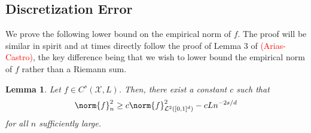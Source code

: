 \documentclass{article}
\newcommand{\1}{\mathbf{1}}
\newcommand{\Xset}{\mathcal{X}}
\newcommand{\Leb}{\mathcal{L}}
\theoremstyle{alden}
\theoremstyle{aldenthm}
\newtheorem{lemma}{Lemma}
\theoremstyle{definition}
\theoremstyle{remark}
\begin{document}
\subsection{Discretization Error}
We prove the following lower bound on the empirical norm of $f$. The proof will be similar in spirit and at times directly follow the proof of Lemma 3 of \textcolor{red}{(Arias-Castro)}, the key difference being that we wish to lower bound the empirical norm of $f$ rather than a Riemann sum.
\begin{lemma}
	\label{lem:discretization_error_holder}
	Let $f \in C^s(\Xset,L)$. Then, there exist a constant $c$ such that
	\begin{equation*}
	\norm{f}_{n}^2 \geq c\norm{f}_{\Leb^2([0,1]^d)}^2 - c L n^{-2s/d}
	\end{equation*}
	for all $n$ sufficiently large.
\end{lemma}
\end{document}
